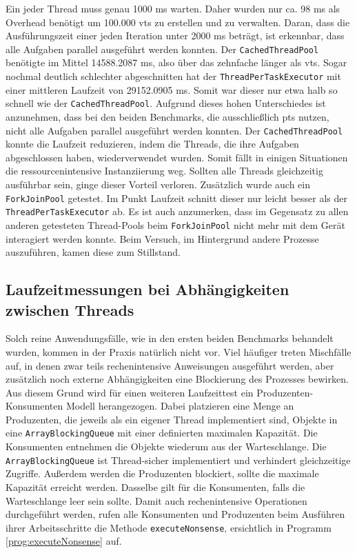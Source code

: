     Ein jeder Thread muss genau
    1000 ms warten. Daher wurden nur ca. 98 ms als Overhead benötigt um 100.000 \Glspl{vt} zu erstellen und zu verwalten. Daran, dass die Ausführungszeit einer jeden Iteration unter 2000 ms beträgt, ist
    erkennbar, dass alle Aufgaben parallel ausgeführt werden konnten.
    Der \texttt{CachedThreadPool} benötigte im Mittel 14588.2087 ms, also über das zehnfache länger als \Glspl{vt}.
    Sogar nochmal deutlich schlechter abgeschnitten hat der \texttt{ThreadPerTaskExecutor} mit einer mittleren Laufzeit von 29152.0905 ms. Somit war dieser nur etwa halb so schnell wie
    der \texttt{CachedThreadPool}. Aufgrund dieses hohen Unterschiedes ist anzunehmen, dass bei den beiden Benchmarks, die ausschließlich \Glspl{pt} nutzen, nicht alle Aufgaben parallel ausgeführt
    werden konnten. Der \texttt{CachedThreadPool} konnte die Laufzeit reduzieren, indem die Threads, die ihre Aufgaben abgeschlossen haben, wiederverwendet wurden. Somit fällt in einigen Situationen 
    die ressourcenintensive Instanziierung weg. Sollten alle Threads gleichzeitig ausführbar sein, ginge dieser Vorteil verloren. Zusätzlich wurde auch ein \texttt{ForkJoinPool} getestet. 
    Im Punkt Laufzeit schnitt dieser nur leicht besser als der \texttt{ThreadPerTaskExecutor} ab. Es ist auch anzumerken, dass 
    im Gegensatz zu allen anderen getesteten Thread-Pools beim \texttt{ForkJoinPool} nicht mehr mit dem Gerät interagiert werden konnte. Beim Versuch, im Hintergrund andere Prozesse auszuführen, kamen diese zum 
    Stillstand. 

\subsection{Laufzeitmessungen bei Abhängigkeiten zwischen Threads}
\label{subsec:LaufzeitmessungenbeiAbhängigkeitenzwischenThreads}

    Solch reine Anwendungsfälle, wie in den ersten beiden Benchmarks behandelt wurden, kommen in der Praxis natürlich nicht vor. Viel häufiger treten Mischfälle auf, in denen zwar teils rechenintensive Anweisungen
    ausgeführt werden,
    aber zusätzlich noch externe Abhängigkeiten eine Blockierung des Prozesses bewirken. Aus diesem Grund wird für einen weiteren Laufzeittest ein Produzenten-Konsumenten Modell herangezogen.
    Dabei platzieren eine Menge an Produzenten, die jeweils als ein eigener Thread implementiert sind, Objekte in eine \texttt{ArrayBlockingQueue} mit einer definierten maximalen Kapazität.
    Die Konsumenten entnehmen die Objekte wiederum aus der Warteschlange. Die \texttt{ArrayBlockingQueue} ist Thread-sicher implementiert und verhindert gleichzeitige Zugriffe. Außerdem werden 
    die Produzenten blockiert, sollte die maximale Kapazität erreicht werden. Dasselbe gilt für die Konsumenten, falls die Warteschlange leer sein sollte. 
    Damit auch rechenintensive Operationen durchgeführt werden, rufen alle Konsumenten und Produzenten beim Ausführen ihrer Arbeitsschritte die Methode \texttt{executeNonsense}, ersichtlich
    in Programm \ref{prog:executeNonsense} auf.

